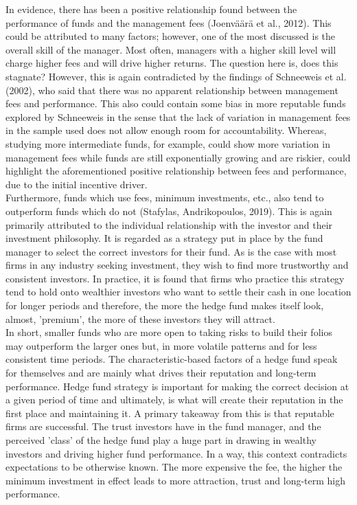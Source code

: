 \documentclass[11pt, english]{article}
\begin{document}
	In evidence, there has been a positive relationship found between the performance of funds and the management fees (Joenv\"{a}\"{a}r\"{a} et al., 2012). This could be attributed to many factors; however, one of the most discussed is the overall skill of the manager. Most often, managers with a higher skill level will charge higher fees and will drive higher returns. The question here is, does this stagnate? However, this is again contradicted by the findings of Schneeweis et al. (2002), who said that there was no apparent relationship between management fees and performance. This also could contain some bias in more reputable funds explored by Schneeweis in the sense that the lack of variation in management fees in the sample used does not allow enough room for accountability. Whereas, studying more intermediate funds, for example, could show more variation in management fees while funds are still exponentially growing and are riskier, could highlight the aforementioned positive relationship between fees and performance, due to the initial incentive driver.\\

	Furthermore, funds which use fees, minimum investments, etc., also tend to outperform funds which do not (Stafylas, Andrikopoulos, 2019). This is again primarily attributed to the individual relationship with the investor and their investment philosophy. It is regarded as a strategy put in place by the fund manager to select the correct investors for their fund. As is the case with most firms in any industry seeking investment, they wish to find more trustworthy and consistent investors. In practice, it is found that firms who practice this strategy tend to hold onto wealthier investors who want to settle their cash in one location for longer periods and therefore, the more the hedge fund makes itself look, almost, 'premium', the more of these investors they will attract.\\

	In short, smaller funds who are more open to taking risks to build their folios may outperform the larger ones but, in more volatile patterns and for less consistent time periods. The characteristic-based factors of a hedge fund speak for themselves and are mainly what drives their reputation and long-term performance. Hedge fund strategy is important for making the correct decision at a given period of time and ultimately, is what will create their reputation in the first place and maintaining it. A primary takeaway from this is that reputable firms are successful. The trust investors have in the fund manager, and the perceived 'class' of the hedge fund play a huge part in drawing in wealthy investors and driving higher fund performance. In a way, this context contradicts expectations to be otherwise known. The more expensive the fee, the higher the minimum investment in effect leads to more attraction, trust and long-term high performance.
\end{document}
